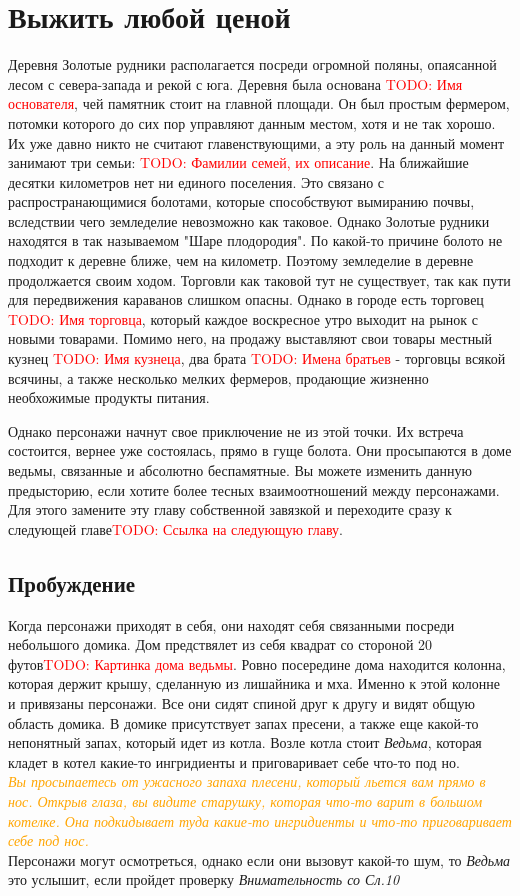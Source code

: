 \documentclass[10pt,a4paper]{book}
\newcommand{\TODO}[1]{\textcolor{red}{TODO: #1}}
\newcommand{\monster}[1]{\textit{#1}}
\newcommand{\dm}[1]{\\\textcolor{orange}{\textit{#1}}\\}
\renewcommand{\check}[2]{\textit{#1 со Сл.#2}}
\begin{document}
	\chapter{Выжить любой ценой}
		Деревня Золотые рудники располагается посреди огромной поляны, опаясанной лесом с севера-запада и рекой с юга. Деревня была основана \TODO{Имя основателя}, чей памятник стоит на главной площади. Он был простым фермером, потомки которого до сих пор управляют данным местом, хотя и не так хорошо. Их уже давно никто не считают главенствующими, а эту роль на данный момент занимают три семьи: \TODO{Фамилии семей, их описание}. На ближайшие десятки километров нет ни единого поселения. Это связано с распространающимися болотами, которые способствуют вымиранию почвы, вследствии чего земледелие невозможно как таковое. Однако Золотые рудники находятся в так называемом "Шаре плодородия". По какой-то причине болото не подходит к деревне ближе, чем на километр. Поэтому земледелие в деревне продолжается своим ходом. Торговли как таковой тут не существует, так как пути для передвижения караванов слишком опасны. Однако в городе есть торговец \TODO{Имя торговца}, который каждое воскресное утро выходит на рынок с новыми товарами. Помимо него, на продажу выставляют свои товары местный кузнец \TODO{Имя кузнеца}, два брата \TODO{Имена братьев} - торговцы всякой всячины, а также несколько мелких фермеров, продающие жизненно необхожимые продукты питания.

		Однако персонажи начнут свое приключение не из этой точки. Их встреча состоится, вернее уже состоялась, прямо в гуще болота. Они просыпаются в доме ведьмы, связанные и абсолютно беспамятные. Вы можете изменить данную предысторию, если хотите более тесных взаимоотношений между персонажами. Для этого замените эту главу собственной завязкой и переходите сразу к следующей главе\TODO{Ссылка на следующую главу}.
		
		\section{Пробуждение}
			Когда персонажи приходят в себя, они находят себя связанными посреди небольшого домика. Дом предствялет из себя квадрат со стороной 20 футов\TODO{Картинка дома ведьмы}. Ровно посередине дома находится колонна, которая держит крышу, сделанную из лишайника и мха. Именно к этой колонне и привязаны персонажи. Все они сидят спиной друг к другу и видят общую область домика. В домике присутствует запах пресени, а также еще какой-то непонятный запах, который идет из котла. Возле котла стоит \monster{Ведьма}, которая кладет в котел какие-то ингридиенты и приговаривает себе что-то под но.
			\dm{Вы просыпаетесь от ужасного запаха плесени, который льется вам прямо в нос. Открыв глаза, вы видите старушку, которая что-то варит в большом котелке. Она подкидывает туда какие-то ингридиенты и что-то приговаривает себе под нос.}
			Персонажи могут осмотреться, однако если они вызовут какой-то шум, то \monster{Ведьма} это услышит, если пройдет проверку \check{Внимательность}{10}
		
\end{document}

